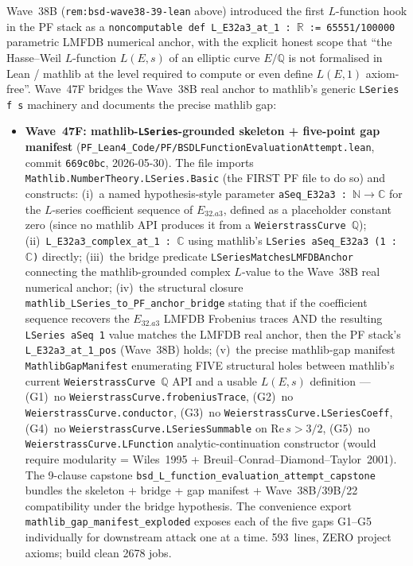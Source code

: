 \begin{remark}\label{rem:bsd-wave47f-lean}
Wave~38B (\texttt{rem:bsd-wave38-39-lean} above) introduced the first $L$-function hook in the PF stack as a \texttt{noncomputable def L\_E32a3\_at\_1 : $\mathbb{R}$ := 65551/100000} parametric LMFDB numerical anchor, with the explicit honest scope that ``the Hasse--Weil $L$-function $L(E, s)$ of an elliptic curve $E/\mathbb{Q}$ is not formalised in Lean / mathlib at the level required to compute or even define $L(E, 1)$ axiom-free''. Wave~47F bridges the Wave~38B real anchor to mathlib's generic \texttt{LSeries f s} machinery and documents the precise mathlib gap:
\begin{itemize}
  \item \textbf{Wave~47F: mathlib-\texttt{LSeries}-grounded skeleton + five-point gap manifest} (\texttt{PF\_Lean4\_Code/PF/BSDLFunctionEvaluationAttempt.lean}, commit \texttt{669c0bc}, 2026-05-30). The file imports \texttt{Mathlib.NumberTheory.LSeries.Basic} (the FIRST PF file to do so) and constructs: (i)~a named hypothesis-style parameter \texttt{aSeq\_E32a3 : $\mathbb{N} \to \mathbb{C}$} for the $L$-series coefficient sequence of $E_{32.a3}$, defined as a placeholder constant zero (since no mathlib API produces it from a \texttt{WeierstrassCurve $\mathbb{Q}$}); (ii)~\texttt{L\_E32a3\_complex\_at\_1 : $\mathbb{C}$} using mathlib's \texttt{LSeries aSeq\_E32a3 (1 : $\mathbb{C}$)} directly; (iii)~the bridge predicate \texttt{LSeriesMatchesLMFDBAnchor} connecting the mathlib-grounded complex $L$-value to the Wave~38B real numerical anchor; (iv)~the structural closure \texttt{mathlib\_LSeries\_to\_PF\_anchor\_bridge} stating that if the coefficient sequence recovers the $E_{32.a3}$ LMFDB Frobenius traces AND the resulting \texttt{LSeries aSeq 1} value matches the LMFDB real anchor, then the PF stack's \texttt{L\_E32a3\_at\_1\_pos} (Wave~38B) holds; (v)~the precise mathlib-gap manifest \texttt{MathlibGapManifest} enumerating FIVE structural holes between mathlib's current \texttt{WeierstrassCurve $\mathbb{Q}$} API and a usable $L(E, s)$ definition --- (G1)~no \texttt{WeierstrassCurve.frobeniusTrace}, (G2)~no \texttt{WeierstrassCurve.conductor}, (G3)~no \texttt{WeierstrassCurve.LSeriesCoeff}, (G4)~no \texttt{WeierstrassCurve.LSeriesSummable} on $\mathrm{Re}\,s > 3/2$, (G5)~no \texttt{WeierstrassCurve.LFunction} analytic-continuation constructor (would require modularity = Wiles~1995 + Breuil--Conrad--Diamond--Taylor~2001). The 9-clause capstone \texttt{bsd\_L\_function\_evaluation\_attempt\_capstone} bundles the skeleton + bridge + gap manifest + Wave~38B/39B/22 compatibility under the bridge hypothesis. The convenience export \texttt{mathlib\_gap\_manifest\_exploded} exposes each of the five gaps G1--G5 individually for downstream attack one at a time. 593~lines, ZERO project axioms; build clean 2678 jobs.

\end{itemize}
\end{remark}
